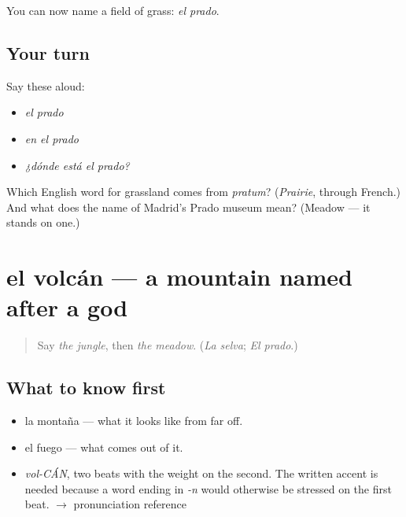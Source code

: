 \begin{grammarlens}[title={What you've built}]
You can now name a field of grass: \emph{el prado}.
\end{grammarlens}

\subsection*{Your turn}
Say these aloud:

\begin{itemize}
\raggedright
  \item \emph{el prado}
  \item \emph{en el prado}
  \item \emph{¿dónde está el prado?}
\end{itemize}

\begin{tcolorbox}[breakable,colback=teal!4,colframe=teal!35!black,title={Before you move on}]
Which English word for grassland comes from \emph{pratum}? (\emph{Prairie}, through French.) And what does the name of Madrid's Prado museum mean? (Meadow — it stands on one.)
\end{tcolorbox}
\section[el volcán]{el volcán — a mountain named after a god}

\label{lesson:ES-C378-volcan}



\begin{quote}
Say \emph{the jungle}, then \emph{the meadow}. (\emph{La selva}; \emph{El prado}.)
\end{quote}

\subsection*{What to know first}
\begin{itemize}
\raggedright
  \item la montaña — what it looks like from far off.
  \item el fuego — what comes out of it.
\end{itemize}

\begin{sounds}
\begin{itemize}
\raggedright
  \item \emph{vol-CÁN}, two beats with the weight on the second. The written accent is needed because a word ending in \emph{-n} would otherwise be stressed on the first beat. $\to$ pronunciation reference
\end{itemize}
\end{sounds}

